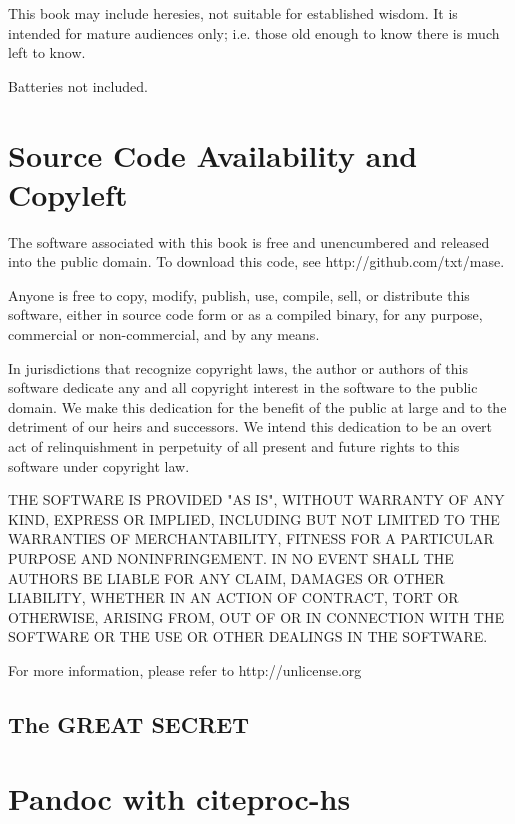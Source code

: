 \documentclass[9pt,twocolumn]{article}
\newcommand{\said}[1]{\citet*{#1}}
\begin{document}
This book may include heresies, not suitable for established wisdom. It is
intended for mature audiences only; i.e.  those
old enough to know there is much left to know. 

Batteries not included.

\section*{Source Code Availability and Copyleft}
The software associated with this book
is free and unencumbered and released into the public domain. To download this code, see http://github.com/txt/mase.

Anyone is free to copy, modify, publish, use, compile, sell, or
distribute this software, either in source code form or as a compiled
binary, for any purpose, commercial or non-commercial, and by any
means.

In jurisdictions that recognize copyright laws, the author or authors
of this software dedicate any and all copyright interest in the
software to the public domain. We make this dedication for the benefit
of the public at large and to the detriment of our heirs and
successors. We intend this dedication to be an overt act of
relinquishment in perpetuity of all present and future rights to this
software under copyright law.

THE SOFTWARE IS PROVIDED "AS IS", WITHOUT WARRANTY OF ANY KIND,
EXPRESS OR IMPLIED, INCLUDING BUT NOT LIMITED TO THE WARRANTIES OF
MERCHANTABILITY, FITNESS FOR A PARTICULAR PURPOSE AND NONINFRINGEMENT.
IN NO EVENT SHALL THE AUTHORS BE LIABLE FOR ANY CLAIM, DAMAGES OR
OTHER LIABILITY, WHETHER IN AN ACTION OF CONTRACT, TORT OR OTHERWISE,
ARISING FROM, OUT OF OR IN CONNECTION WITH THE SOFTWARE OR THE USE OR
OTHER DEALINGS IN THE SOFTWARE.

For more information, please refer to http://unlicense.org


\newpage








\subsection*{The GREAT SECRET}



\section{Pandoc with citeproc-hs}\label{pandoc-with-citeproc-hs}

\said{item3}


\end{document}

